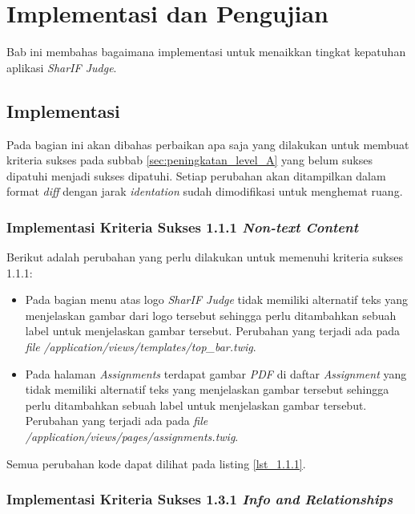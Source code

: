 \chapter{Implementasi dan Pengujian}
\label{chap:implementasi}

Bab ini membahas bagaimana implementasi untuk menaikkan tingkat kepatuhan aplikasi \textit{SharIF Judge}.

\section{Implementasi}
\label{sec:implementasi}

Pada bagian ini akan dibahas perbaikan apa saja yang dilakukan untuk membuat kriteria sukses pada subbab \ref{sec:peningkatan_level_A}
yang belum sukses dipatuhi menjadi sukses dipatuhi. Setiap perubahan akan ditampilkan dalam format \textit{diff} dengan jarak \textit{identation} sudah dimodifikasi untuk menghemat ruang.

\subsection{Implementasi Kriteria Sukses 1.1.1 \textit{Non-text Content}}
\label{subsec:implementasi_A_1.1.1}

Berikut adalah perubahan yang perlu dilakukan untuk memenuhi kriteria sukses 1.1.1:

\begin{itemize}
	\item Pada bagian menu atas logo \textit{SharIF Judge} tidak memiliki alternatif teks yang menjelaskan gambar dari logo tersebut sehingga perlu ditambahkan sebuah label untuk menjelaskan gambar tersebut. Perubahan yang terjadi ada pada \textit{file} \textit{/application/views/templates/top\_bar.twig}.

	\item Pada halaman \textit{Assignments} terdapat gambar \textit{PDF} di daftar \textit{Assignment} yang tidak memiliki alternatif teks yang menjelaskan gambar tersebut sehingga perlu ditambahkan sebuah label untuk menjelaskan gambar tersebut. Perubahan yang terjadi ada pada \textit{file} \textit{/application/views/pages/assignments.twig}.
	
\end{itemize}

Semua perubahan kode dapat dilihat pada listing \ref{lst_1.1.1}.

\subsection{Implementasi Kriteria Sukses 1.3.1 \textit{Info and Relationships}}
\label{subsec:implementasi_A_1.3.1}

